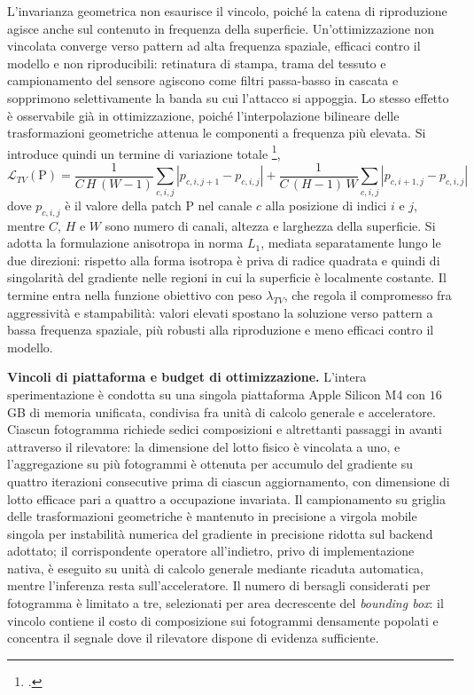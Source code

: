 \documentclass[a4paper,12pt]{report}
\begin{document}
L'invarianza geometrica non esaurisce il vincolo, poiché la catena di
riproduzione agisce anche sul contenuto in frequenza della superficie.
Un'ottimizzazione non vincolata converge verso pattern ad alta frequenza
spaziale, efficaci contro il modello e non riproducibili: retinatura di stampa,
trama del tessuto e campionamento del sensore agiscono come filtri passa-basso
in cascata e sopprimono selettivamente la banda su cui l'attacco si appoggia. Lo
stesso effetto è osservabile già in ottimizzazione, poiché l'interpolazione
bilineare delle trasformazioni geometriche attenua le componenti a frequenza più
elevata. Si introduce quindi un termine di variazione totale
\footcite{thys_2019},
\begin{equation}
    \mathcal{L}_{TV}(\mathrm{P}) =
    \frac{1}{C\,H\,(W-1)} \sum_{c,i,j} \left| p_{c,i,j+1} - p_{c,i,j} \right|
    + \frac{1}{C\,(H-1)\,W} \sum_{c,i,j} \left| p_{c,i+1,j} - p_{c,i,j} \right|
    \label{eq:tv}
\end{equation}
dove $p_{c,i,j}$ è il valore della patch $\mathrm{P}$ nel canale $c$ alla
posizione di indici $i$ e $j$, mentre $C$, $H$ e $W$ sono numero di canali,
altezza e larghezza della superficie. Si adotta la formulazione anisotropa in
norma $L_1$, mediata separatamente lungo le due direzioni: rispetto alla forma
isotropa è priva di radice quadrata e quindi di singolarità del gradiente nelle
regioni in cui la superficie è localmente costante. Il termine entra nella
funzione obiettivo con peso $\lambda_{TV}$, che regola il compromesso fra
aggressività e stampabilità: valori elevati spostano la soluzione verso pattern
a bassa frequenza spaziale, più robusti alla riproduzione e meno efficaci contro
il modello.

\textbf{Vincoli di piattaforma e budget di ottimizzazione.}
\label{sec:accumulo}
L'intera sperimentazione è condotta su una singola piattaforma Apple Silicon M4
con $16$\,GB di memoria unificata, condivisa fra unità di calcolo generale e
acceleratore. Ciascun fotogramma richiede sedici composizioni e altrettanti
passaggi in avanti attraverso il rilevatore: la dimensione del lotto fisico è
vincolata a uno, e l'aggregazione su più fotogrammi è ottenuta per accumulo del
gradiente su quattro iterazioni consecutive prima di ciascun aggiornamento, con
dimensione di lotto efficace pari a quattro a occupazione invariata. Il
campionamento su griglia delle trasformazioni geometriche è mantenuto in
precisione a virgola mobile singola per instabilità numerica del gradiente in
precisione ridotta sul backend adottato; il corrispondente operatore
all'indietro, privo di implementazione nativa, è eseguito su unità di calcolo
generale mediante ricaduta automatica, mentre l'inferenza resta
sull'acceleratore. Il numero di bersagli considerati per fotogramma è limitato a
tre, selezionati per area decrescente del \textit{bounding box}: il vincolo
contiene il costo di composizione sui fotogrammi densamente popolati e concentra
il segnale dove il rilevatore dispone di evidenza sufficiente.
\end{document}
